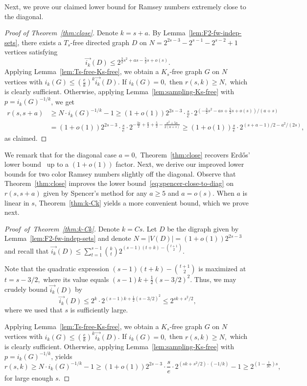 \documentclass{article}
\theoremstyle{plain}
\theoremstyle{definition}
\newcommand{\fwi}[1]{\overrightarrow{i_{#1}}}
\begin{document}
Next, we prove our claimed lower bound for Ramsey numbers extremely close to the diagonal.

\begin{proof}[Proof of Theorem~\ref{thm:close}]
    Denote $k = s+a$. By Lemma~\ref{lem:F2-fw-indep-sets}, there exists a $T_s$-free directed graph $D$ on $N = 2^{2s-3} - 2^{s-1} - 2^{s-2} + 1$ vertices satisfying 
    \[ \fwi{k}(D) \le 2^{\frac{3}{2}s^2 + as - \frac{5}{2}s + o(s)}. \]    
    Applying Lemma~\ref{lem:Ts-free-Ks-free}, we obtain a $K_s$-free graph $G$ on $N$ vertices with $i_k(G) \le \left( \frac{e}{k}\right)^k \fwi{k}(D)$. If $i_k(G) = 0, $ then $r(s, k) \ge N,$ which is clearly sufficient. Otherwise, applying Lemma~\ref{lem:sampling-Ks-free} with $p = i_k(G)^{-1/k}$, we get
    \begin{align*}
        r(s, s+a) &\ge N \cdot i_k(G)^{-1/k} - 1 \ge (1+o(1))2^{2s-3} \cdot \frac{s}{e} \cdot 2^{(-\frac{3}{2}s^2 - as + \frac{5}{2}s + o(s)) / (a+s)}\\ &= (1+o(1))2^{2s-3} \cdot \frac{s}{e} \cdot 2^{-\frac{3s}{2} + \frac{a}{2} + \frac{5}{2} - \frac{a^2 + 5a}{2(a+s)}}
        \ge (1 + o(1)) \frac{s}{e}\cdot 2^{(s + a - 1)/2 - a^2 / (2s)},
    \end{align*}
    as claimed.
\end{proof}

We remark that for the diagonal case $a = 0,$ Theorem~\ref{thm:close} recovers Erd\H{o}s' lower bound~\cite{erdos-lb} up to a $(1 + o(1))$ factor. Next, we derive our improved lower bounds for two color Ramsey numbers slightly off the diagonal. Observe that Theorem~\ref{thm:close} improves the lower bound~\eqref{eq:spencer-close-to-diag} on $r(s, s+a)$ given by Spencer's method for any $a \ge 5$ and $a = o(s)$. When $a$ is linear in $s$, Theorem~\ref{thm:k-Ck} yields a more convenient bound, which we prove next.

\begin{proof}[Proof~of~Theorem~\ref{thm:k-Ck}]
    Denote $k = Cs$. Let $D$ be the digraph given by Lemma~\ref{lem:F2-fw-indep-sets} and denote $N = |V(D)| = (1+o(1)) 2^{2s-3}$ and recall that $\fwi{k}(D) \le \sum_{t=1}^{s-1} \binom{k}{t} 2^{(s-1)(t+k) - \binom{t+1}{2}}$.

    Note that the quadratic expression $(s-1)(t+k) - \binom{t+1}{2}$ is maximized at $t = s - 3/2,$ where its value equals $(s-1)k + \frac{1}{2}(s - 3/2)^2$. Thus, we may crudely bound $\fwi{k}(D)$ by
    \[ \fwi{k}(D) \le 2^k \cdot 2^{(s-1)k + \frac{1}{2}(s - 3/2)^2} \le  2^{sk + s^2/2}, \]
    where we used that $s$ is sufficiently large.

    Applying Lemma~\ref{lem:Ts-free-Ks-free}, we obtain a $K_s$-free graph $G$ on $N$ vertices with $i_k(G) \le \left( \frac{e}{k}\right)^k \fwi{k}(D)$. If $i_k(G) = 0, $ then $r(s, k) \ge N,$ which is clearly sufficient. Otherwise, applying Lemma~\ref{lem:sampling-Ks-free} with $p = i_k(G)^{-1/k}$, yields
    \[ r(s, k) \ge N \cdot i_k(G)^{-1/k} - 1 \ge (1 + o(1)) 2^{2s-3} \cdot \frac{s}{e} \cdot 2^{(sk + s^2/2) \cdot (-1 / k)} - 1 \ge 2^{\left(1 - \frac{1}{2C} \right)s}, \]
    for large enough $s$.
\end{proof}
\end{document}
